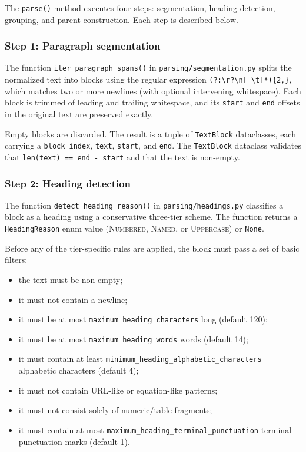 \documentclass[11pt,a4paper]{article}
\begin{document}
The \texttt{parse()} method executes four steps: segmentation,
heading detection, grouping, and parent construction. Each step is
described below.

\subsubsection{Step 1: Paragraph segmentation}
The function \texttt{iter\_paragraph\_spans()} in
\texttt{parsing/segmentation.py} splits the normalized text into
blocks using the regular expression
\texttt{(?:\textbackslash r?\textbackslash n[ \textbackslash t]*)\{2,\}},
which matches two or more newlines (with optional intervening
whitespace). Each block is trimmed of leading and trailing
whitespace, and its \texttt{start} and \texttt{end} offsets in the
original text are preserved exactly.

Empty blocks are discarded. The result is a tuple of \texttt{TextBlock}
dataclasses, each carrying a \texttt{block\_index}, \texttt{text},
\texttt{start}, and \texttt{end}. The \texttt{TextBlock} dataclass
validates that \texttt{len(text) == end - start} and that the text is
non-empty.

\subsubsection{Step 2: Heading detection}
The function \texttt{detect\_heading\_reason()} in
\texttt{parsing/headings.py} classifies a block as a heading using a
conservative three-tier scheme. The function returns a
\texttt{HeadingReason} enum value (\textsc{Numbered}, \textsc{Named},
or \textsc{Uppercase}) or \texttt{None}.

Before any of the tier-specific rules are applied, the block must
pass a set of basic filters:
\begin{itemize}[leftmargin=1.5em,itemsep=0.15em]
  \item the text must be non-empty;
  \item it must not contain a newline;
  \item it must be at most \texttt{maximum\_heading\_characters} long
    (default \num{120});
  \item it must be at most \texttt{maximum\_heading\_words} words
    (default \num{14});
  \item it must contain at least
    \texttt{minimum\_heading\_alphabetic\_characters} alphabetic
    characters (default \num{4});
  \item it must not contain URL-like or equation-like patterns;
  \item it must not consist solely of numeric/table fragments;
  \item it must contain at most
    \texttt{maximum\_heading\_terminal\_punctuation} terminal
    punctuation marks (default \num{1}).
\end{itemize}
\end{document}

